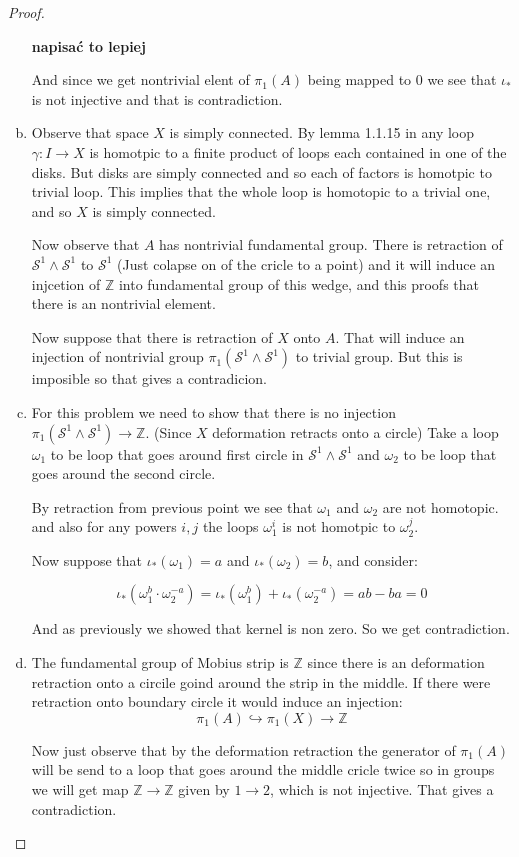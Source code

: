 \documentclass[11pt, a4paper, final]{amsart}
\newcommand{\Z}{{\mathbb{Z}}}
\newcommand\todo[1]{\textbf{\textcolor{redd}{#1}}}
\newcommand{\sphere}{\mathcal{S}}
\numberwithin{theorem}{section}
\theoremstyle{definition}
\theoremstyle{remark}
\begin{document}
\begin{proof}
\begin{enumerate}[(a)]
        \todo{napisać to lepiej}
        
        And since we get nontrivial elent of $\pi_1(A)$ being mapped to $0$ we see that $\iota_{*}$ is not injective and that is contradiction.

        \item Observe that space $X$ is simply connected. By lemma 1.1.15 in \cite{AH} any loop $\gamma : I \to X$ is homotpic to a finite product
        of loops each contained in one of the disks. But disks are simply connected and so each of factors is homotpic to trivial loop. This implies
        that the whole loop is homotopic to a trivial one, and so $X$ is simply connected.

        Now observe that $A$ has nontrivial fundamental group. There is retraction of $\sphere^1 \wedge \sphere^1$ to $\sphere^1$ (Just colapse
        on of the cricle to a point) and it will induce an injcetion of $\Z$ into fundamental group of this wedge, and this proofs that there is an nontrivial element.

        Now suppose that there is retraction of $X$ onto $A$. That will induce an injection of nontrivial group $\pi_1(\sphere^1 \wedge \sphere^1)$ to trivial group. 
        But this is imposible so that gives a contradicion.

        \item For this problem we need to show that there is no injection 
        $\pi_1(\sphere^1 \wedge \sphere^1) \to \Z$. (Since $X$ deformation retracts onto a circle)
        Take a loop $\omega_1$ to be loop that goes around first circle in $\sphere^1 \wedge  \sphere^1$ and 
        $\omega_2$ to be loop that goes around the second circle. 

        By retraction from previous point we see that $\omega_1$ and $\omega_2$ are not homotopic.  
        and also for any powers $i,j$ the loops $\omega_1 ^ i $ is not homotpic to $\omega_2 ^j$. 
        
        Now suppose that $\iota_{*}(\omega_1) = a$ and $\iota_{*}(\omega_2) = b$, and consider:

        $$\iota_{*}(\omega_1^b \cdot \omega_2^{-a}) =  \iota_{*}(\omega_1^b) + \iota_{*}(\omega_2^{-a}) = ab - ba = 0$$

        And as previously we showed that kernel is non zero. So we get contradiction.

        \item The fundamental group of Mobius strip is $\Z$ since there is an deformation retraction onto a circile goind around the strip in the middle.
        If there were retraction onto boundary circle it would induce an injection:
        $$\pi_1(A) \hookrightarrow \pi_1(X) \to \Z$$

        Now just observe that by the deformation retraction the generator of $\pi_1(A)$ will be send to a loop that goes around
        the middle cricle twice so in groups we will get map $\Z \to \Z$ given by $1 \to 2$, which is not injective. 
        That gives a contradiction.
    \end{enumerate}
\end{proof}
\end{document}
